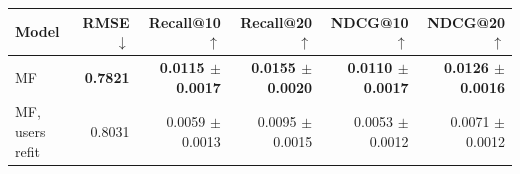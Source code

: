 \begin{tabular}{lrrrrr}
\toprule
Model & RMSE $\downarrow$ & Recall@10 $\uparrow$ & Recall@20 $\uparrow$ & NDCG@10 $\uparrow$ & NDCG@20 $\uparrow$ \\
\midrule
MF & \textbf{0.7821} & \textbf{0.0115 $\pm$ 0.0017} & \textbf{0.0155 $\pm$ 0.0020} & \textbf{0.0110 $\pm$ 0.0017} & \textbf{0.0126 $\pm$ 0.0016} \\
MF, users refit & 0.8031 & 0.0059 $\pm$ 0.0013 & 0.0095 $\pm$ 0.0015 & 0.0053 $\pm$ 0.0012 & 0.0071 $\pm$ 0.0012 \\
\bottomrule
\end{tabular}
